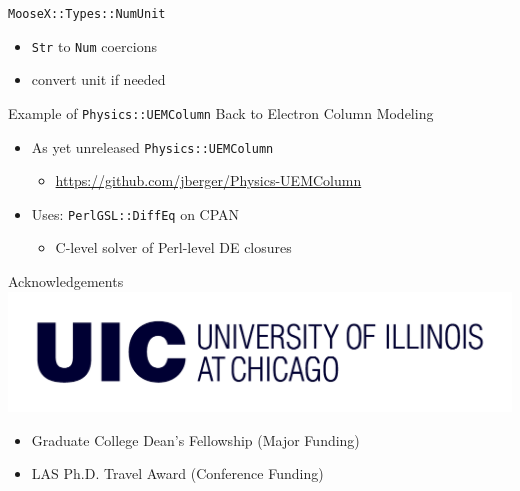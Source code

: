 \documentclass[mathserif]{beamer}
\providecommand{\code}[1]{{\texttt{\scriptsize{#1}}}}
\begin{document}
\begin{frame}{\texttt{MooseX::Types::NumUnit}}
  \begin{itemize}
    \item \code{Str} to \code{Num} coercions
    \item convert unit if needed
  \end{itemize}
  \begin{block}{}
    \scriptsize
    
  \end{block}
\end{frame}

\begin{frame}{Example of \texttt{Physics::UEMColumn}}
  Back to Electron Column Modeling
  
  \begin{itemize}
    \item As yet unreleased \code{Physics::UEMColumn}
    \begin{itemize}
      \item \url{https://github.com/jberger/Physics-UEMColumn}
    \end{itemize}
    \item Uses: \code{PerlGSL::DiffEq} on CPAN
    \begin{itemize}
      \item C-level solver of Perl-level DE closures
    \end{itemize}
  \end{itemize}
\end{frame}

\begin{frame}{Acknowledgements}
  \includegraphics[width=0.7\linewidth]{uic}
  \begin{itemize}
    \item Graduate College Dean's Fellowship (Major Funding)
    \item LAS Ph.D. Travel Award (Conference Funding)
  \end{itemize}
\end{frame}
\end{document}
